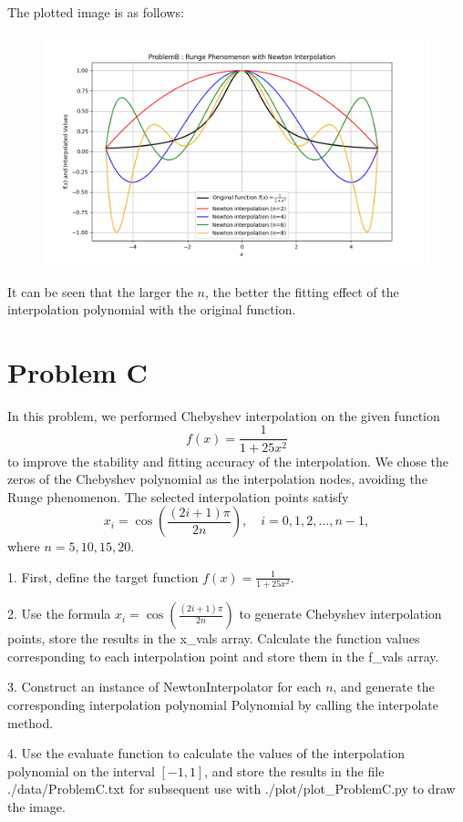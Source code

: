 \documentclass[a4paper]{article}
\begin{document}
The plotted image is as follows:
\begin{figure}[h]
    \centering
    \includegraphics[width=0.75\linewidth]{Pictures/ProblemB_figure.png}
    \label{fig:enter-label}
\end{figure}

It can be seen that the larger the \( n \), the better the fitting effect of the interpolation polynomial with the original function.

\newpage
\section*{Problem C}

In this problem, we performed Chebyshev interpolation on the given function 
\[
f(x) = \frac{1}{1 + 25x^2}
\]
to improve the stability and fitting accuracy of the interpolation. We chose the zeros of the Chebyshev polynomial as the interpolation nodes, avoiding the Runge phenomenon. The selected interpolation points satisfy
\[
x_i = \cos \left( \frac{(2i + 1) \pi}{2n} \right), \quad i = 0, 1, 2, \ldots, n - 1,
\]
where \( n = 5, 10, 15, 20 \).

1. First, define the target function \( f(x) = \frac{1}{1 + 25 x^2} \).

2. Use the formula \( x_i = \cos \left( \frac{(2i + 1) \pi}{2n} \right) \) to generate Chebyshev interpolation points, store the results in the x\_vals array. Calculate the function values corresponding to each interpolation point and store them in the f\_vals array.

3. Construct an instance of NewtonInterpolator for each \( n \), and generate the corresponding interpolation polynomial Polynomial by calling the interpolate method.

4. Use the evaluate function to calculate the values of the interpolation polynomial on the interval \([-1, 1]\), and store the results in the file ./data/ProblemC.txt for subsequent use with ./plot/plot\_ProblemC.py to draw the image.
\end{document}
